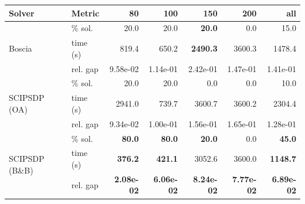 \begin{tabular}{llrrrrr}
\toprule
 Solver & Metric & 80 & 100 & 150 & 200 & all \\
\midrule
\multirow{3}{*}{Boscia} & \% sol. & 20.0 & 20.0 & \textbf{20.0} & 0.0 & 15.0 \\
  & time (s) & 819.4 & 650.2 & \textbf{2490.3} & 3600.3 & 1478.4 \\
  & rel. gap & 9.58e-02 & 1.14e-01 & 2.42e-01 & 1.47e-01 & 1.41e-01 \\
\midrule
\multirow{3}{*}{SCIPSDP (OA)} & \% sol. & 20.0 & 20.0 & 0.0 & 0.0 & 10.0 \\
  & time (s) & 2941.0 & 739.7 & 3600.7 & 3600.2 & 2304.4 \\
  & rel. gap & 9.34e-02 & 1.00e-01 & 1.56e-01 & 1.65e-01 & 1.28e-01 \\
\midrule
\multirow{3}{*}{SCIPSDP (B\&B)} & \% sol. & \textbf{80.0} & \textbf{80.0} & \textbf{20.0} & 0.0 & \textbf{45.0} \\
  & time (s) & \textbf{376.2} & \textbf{421.1} & 3052.6 & 3600.0 & \textbf{1148.7} \\
  & rel. gap & \textbf{2.08e-02} & \textbf{6.06e-02} & \textbf{8.24e-02} & \textbf{7.77e-02} & \textbf{6.89e-02} \\
\bottomrule
\end{tabular}
